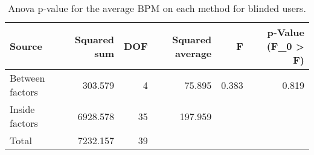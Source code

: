 
\begin{table}[!htb]
\centering
\caption{Anova p-value for the average BPM on each method for blinded users.}
\label{tab:anova_average_bpm}
\begin{tabular}{lrrrrr}
\toprule
         Source &  Squared sum &  DOF & Squared average &     F & p-Value (F\_0 > F) \\
\midrule
Between factors &      303.579 &    4 &          75.895 & 0.383 &             0.819 \\
 Inside factors &     6928.578 &   35 &         197.959 &       &                   \\
          Total &     7232.157 &   39 &                 &       &                   \\
\bottomrule
\end{tabular}
\end{table}

